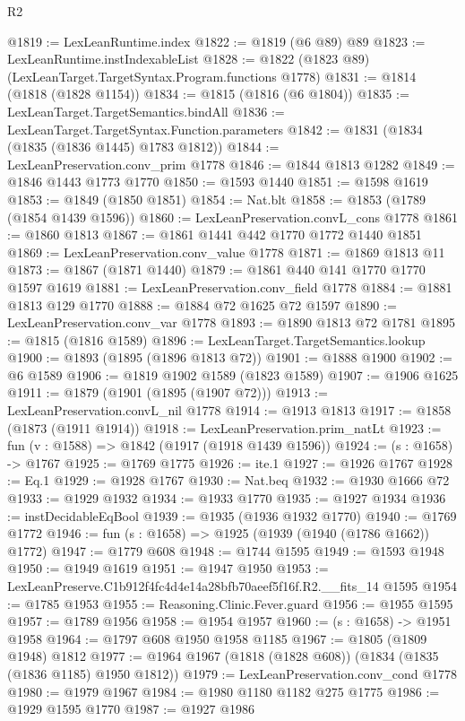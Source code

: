 \begin{lexlean}{R2}
\begin{coremodule}
@1819 := LexLeanRuntime.index
@1822 := @1819 (@6 @89) @89
@1823 := LexLeanRuntime.instIndexableList
@1828 := @1822 (@1823 @89) (LexLeanTarget.TargetSyntax.Program.functions @1778)
@1831 := @1814 (@1818 (@1828 @1154))
@1834 := @1815 (@1816 (@6 @1804))
@1835 := LexLeanTarget.TargetSemantics.bindAll
@1836 := LexLeanTarget.TargetSyntax.Function.parameters
@1842 := @1831 (@1834 (@1835 (@1836 @1445) @1783 @1812))
@1844 := LexLeanPreservation.conv_prim @1778
@1846 := @1844 @1813 @1282
@1849 := @1846 @1443 @1773 @1770
@1850 := @1593 @1440
@1851 := @1598 @1619
@1853 := @1849 (@1850 @1851)
@1854 := Nat.blt
@1858 := @1853 (@1789 (@1854 @1439 @1596))
@1860 := LexLeanPreservation.convL_cons @1778
@1861 := @1860 @1813
@1867 := @1861 @1441 @442 @1770 @1772 @1440 @1851
@1869 := LexLeanPreservation.conv_value @1778
@1871 := @1869 @1813 @11
@1873 := @1867 (@1871 @1440)
@1879 := @1861 @440 @141 @1770 @1770 @1597 @1619
@1881 := LexLeanPreservation.conv_field @1778
@1884 := @1881 @1813 @129 @1770
@1888 := @1884 @72 @1625 @72 @1597
@1890 := LexLeanPreservation.conv_var @1778
@1893 := @1890 @1813 @72 @1781
@1895 := @1815 (@1816 @1589)
@1896 := LexLeanTarget.TargetSemantics.lookup
@1900 := @1893 (@1895 (@1896 @1813 @72))
@1901 := @1888 @1900
@1902 := @6 @1589
@1906 := @1819 @1902 @1589 (@1823 @1589)
@1907 := @1906 @1625
@1911 := @1879 (@1901 (@1895 (@1907 @72)))
@1913 := LexLeanPreservation.convL_nil @1778
@1914 := @1913 @1813
@1917 := @1858 (@1873 (@1911 @1914))
@1918 := LexLeanPreservation.prim_natLt
@1923 := fun (v : @1588) => @1842 (@1917 (@1918 @1439 @1596))
@1924 := (s : @1658) -> @1767
@1925 := @1769 @1775
@1926 := ite.{1}
@1927 := @1926 @1767
@1928 := Eq.{1}
@1929 := @1928 @1767
@1930 := Nat.beq
@1932 := @1930 @1666 @72
@1933 := @1929 @1932
@1934 := @1933 @1770
@1935 := @1927 @1934
@1936 := instDecidableEqBool
@1939 := @1935 (@1936 @1932 @1770)
@1940 := @1769 @1772
@1946 := fun (s : @1658) => @1925 (@1939 (@1940 (@1786 @1662)) @1772)
@1947 := @1779 @608
@1948 := @1744 @1595
@1949 := @1593 @1948
@1950 := @1949 @1619
@1951 := @1947 @1950
@1953 := LexLeanPreserve.C1b912f4fc4d4e14a28bfb70aeef5f16f.R2.__fits_14 @1595
@1954 := @1785 @1953
@1955 := Reasoning.Clinic.Fever.guard
@1956 := @1955 @1595
@1957 := @1789 @1956
@1958 := @1954 @1957
@1960 := (s : @1658) -> @1951 @1958
@1964 := @1797 @608 @1950 @1958 @1185
@1967 := @1805 (@1809 @1948) @1812
@1977 := @1964 @1967 (@1818 (@1828 @608)) (@1834 (@1835 (@1836 @1185) @1950 @1812))
@1979 := LexLeanPreservation.conv_cond @1778
@1980 := @1979 @1967
@1984 := @1980 @1180 @1182 @275 @1775
@1986 := @1929 @1595 @1770
@1987 := @1927 @1986

\end{coremodule}
\end{lexlean}

